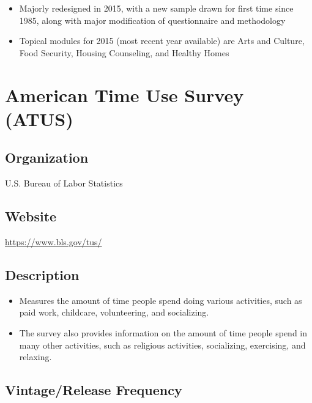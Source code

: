 \documentclass[
]{book}
\providecommand{\tightlist}{%
  \setlength{\itemsep}{0pt}\setlength{\parskip}{0pt}}
\begin{document}
\begin{itemize}
\tightlist
\item
  Majorly redesigned in 2015, with a new sample drawn for first time since 1985, along with major modification of questionnaire and methodology
\item
  Topical modules for 2015 (most recent year available) are Arts and Culture, Food Security, Housing Counseling, and Healthy Homes
\end{itemize}

\mainmatter

\hypertarget{american-time-use-survey-atus}{%
\chapter{American Time Use Survey (ATUS)}\label{american-time-use-survey-atus}}

\hypertarget{organization-8}{%
\section{Organization}\label{organization-8}}

U.S. Bureau of Labor Statistics

\hypertarget{website-8}{%
\section{Website}\label{website-8}}

\url{https://www.bls.gov/tus/}

\hypertarget{description-8}{%
\section{Description}\label{description-8}}

\begin{itemize}
\tightlist
\item
  Measures the amount of time people spend doing various activities, such as paid work, childcare, volunteering, and socializing.
\item
  The survey also provides information on the amount of time people spend in many other activities, such as religious activities, socializing, exercising, and relaxing.
\end{itemize}

\hypertarget{vintagerelease-frequency-8}{%
\section{Vintage/Release Frequency}\label{vintagerelease-frequency-8}}
\end{document}
